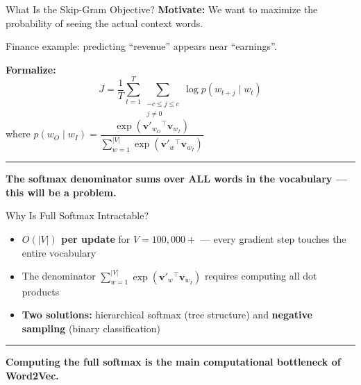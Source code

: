\documentclass[8pt,aspectratio=169]{beamer}
\newcommand{\bottomnote}[1]{%
\vfill
\vspace{-2mm}
\textcolor{mllavender2}{\rule{\textwidth}{0.4pt}}
\vspace{1mm}
\footnotesize
\textbf{#1}
}
\newenvironment{compactlist}{%
  \begin{itemize}%
    \setlength{\itemsep}{2pt}%
    \setlength{\parskip}{0pt}%
    \setlength{\parsep}{0pt}%
}{%
  \end{itemize}%
}
\newcommand{\highlight}[1]{\textcolor{mlorange}{\textbf{#1}}}
\begin{document}
\begin{frame}{What Is the Skip-Gram Objective?}
\textbf{Motivate:} We want to maximize the probability of seeing the actual context words.

\vspace{1mm}
Finance example: predicting ``revenue'' appears near ``earnings''.

\vspace{2mm}
\textbf{Formalize:}
\small
\[
J = \frac{1}{T}\sum_{t=1}^{T}\sum_{\substack{-c \le j \le c \\ j\neq 0}} \log p(w_{t+j} \mid w_t)
\]
where $p(w_O \mid w_I) = \dfrac{\exp(\mathbf{v}'_{w_O}{}^{\!\top} \mathbf{v}_{w_I})}{\sum_{w=1}^{|V|}\exp(\mathbf{v}'_w{}^{\!\top} \mathbf{v}_{w_I})}$
\normalsize
\bottomnote{The softmax denominator sums over ALL words in the vocabulary --- this will be a problem.}
\end{frame}

\begin{frame}{Why Is Full Softmax Intractable?}
\begin{compactlist}
\item \highlight{$O(|V|)$ per update} for $V = 100{,}000+$ --- every gradient step touches the entire vocabulary
\item The denominator $\sum_{w=1}^{|V|}\exp(\mathbf{v}'_w{}^{\!\top}\mathbf{v}_{w_I})$ requires computing all dot products
\item \textbf{Two solutions:} hierarchical softmax (tree structure) and \highlight{negative sampling} (binary classification)
\end{compactlist}
\bottomnote{Computing the full softmax is the main computational bottleneck of Word2Vec.}
\end{frame}
\end{document}
